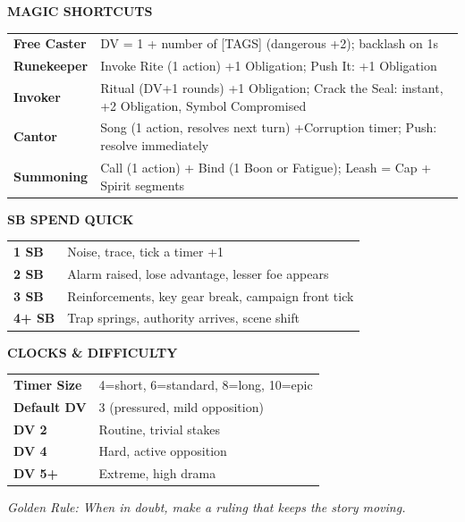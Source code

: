\begin{tcolorbox}[title=\textbf{Fate's Edge -- GM Screen}, colback=blue!5!white, colframe=blue!75!black, sharp corners, fonttitle=\bfseries, center title,breakable]
\vspace{0.5em}
\begin{center}
\large\textbf{MAGIC SHORTCUTS}
\end{center}
\begin{tabularx}{\textwidth}{X|X}
\hline
\textbf{Free Caster} & DV = 1 + number of [TAGS] (dangerous +2); backlash on 1s \\
\textbf{Runekeeper} & Invoke Rite (1 action) +1 Obligation; Push It: +1 Obligation \\
\textbf{Invoker} & Ritual (DV+1 rounds) +1 Obligation; Crack the Seal: instant, +2 Obligation, Symbol Compromised \\
\textbf{Cantor} & Song (1 action, resolves next turn) +Corruption timer; Push: resolve immediately \\
\textbf{Summoning} & Call (1 action) + Bind (1 Boon or Fatigue); Leash = Cap + Spirit segments \\
\hline
\end{tabularx}

\vspace{0.5em}
\begin{center}
\large\textbf{SB SPEND QUICK}
\end{center}
\begin{tabularx}{\textwidth}{X|X}
\hline
\textbf{1 SB} & Noise, trace, tick a timer +1 \\
\textbf{2 SB} & Alarm raised, lose advantage, lesser foe appears \\
\textbf{3 SB} & Reinforcements, key gear break, campaign front tick \\
\textbf{4+ SB} & Trap springs, authority arrives, scene shift \\
\hline
\end{tabularx}

\vspace{0.5em}
\begin{center}
\large\textbf{CLOCKS \& DIFFICULTY}
\end{center}
\begin{tabularx}{\textwidth}{X|X}
\hline
\textbf{Timer Size} & 4=short, 6=standard, 8=long, 10=epic \\
\textbf{Default DV} & 3 (pressured, mild opposition) \\
\textbf{DV 2} & Routine, trivial stakes \\
\textbf{DV 4} & Hard, active opposition \\
\textbf{DV 5+} & Extreme, high drama \\
\hline
\end{tabularx}

\vspace{0.5em}
\small\centering \textit{Golden Rule: When in doubt, make a ruling that keeps the story moving.}
\end{tcolorbox}
